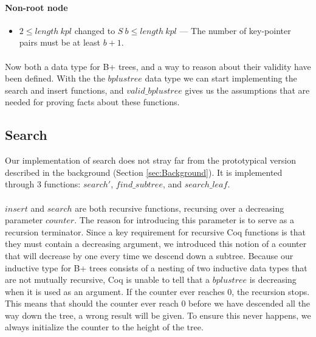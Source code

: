 \paragraph{Non-root node}
\begin{itemize}
\item $2 \leq length\ kpl$ changed to $S\ b \leq length\ kpl$ --- The number of key-pointer pairs must be at least $b+1$.
\end{itemize}

\paragraph{}
Now both a data type for B+ trees, and a way to reason about their validity have been defined. With the the $bplustree$ data type we can start implementing the search and insert functions, and $valid\_bplustree$ gives us the assumptions that are needed for proving facts about these functions.

\subsection{Search}
\label{subsec:search}
Our implementation of search does not stray far from the prototypical version described in the background (Section \ref{sec:Background}). It is implemented through 3 functions: $search'$, $find\_subtree$, and $search\_leaf$. 

\paragraph{}
$insert$ and $search$ are both recursive functions, recursing over a decreasing parameter $counter$. The reason for introducing this parameter is to serve as a recursion terminator. Since a key requirement for recursive Coq functions is that they must contain a decreasing argument, we introduced this notion of a counter that will decrease by one every time we descend down a subtree. Because our inductive type for B+ trees consists of a nesting of two inductive data types that are not mutually recursive, Coq is unable to tell that a $bplustree$ is decreasing when it is used as an argument. If the counter ever reaches $0$, the recursion stops. This means that should the counter ever reach $0$ before we have descended all the way down the tree, a wrong result will be given. To ensure this never happens, we always initialize the counter to the height of the tree.

